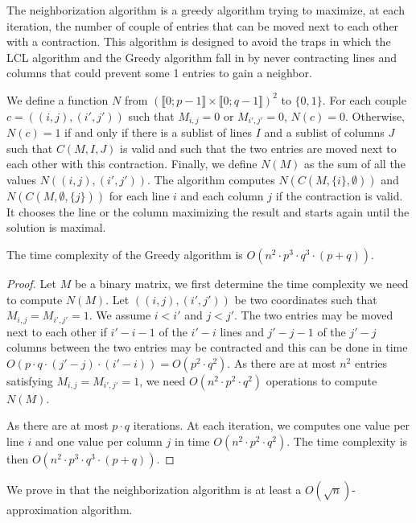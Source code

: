 The neighborization algorithm is a greedy algorithm trying to maximize, at each iteration, the number of couple of entries that can be moved next to each other with a contraction. This algorithm is designed to avoid the traps in which the LCL algorithm and the Greedy algorithm fall in by never contracting lines and columns that could prevent some 1 entries to gain a neighbor.

We define a function $N$ from $(\llbracket 0;p-1 \rrbracket \times \llbracket 0;q-1 \rrbracket)^2$ to $\{0,1\}$.
For each couple $c = ((i,j),(i',j'))$ such that $M_{i,j} = 0$ or $M_{i',j'} = 0$, $N(c) = 0$. Otherwise, $N(c) = 1$ if and only if there is a sublist of lines $I$ and a sublist of columns $J$ such that $C(M,I,J)$ is valid and such that the two entries are moved next to each other with this contraction. Finally, we define $N(M)$ as the sum of all the values $N((i,j),(i',j'))$. The algorithm computes $N(C(M,\{i\},\emptyset))$ and $N(C(M,\emptyset, \{j\}))$ for each line $i$ and each column $j$ if the contraction is valid. It chooses the line or the column maximizing the result and starts again until the solution is maximal.

\begin{theorem}
	The time complexity of the Greedy algorithm is $O(n^2 \cdot p^3 \cdot q^3 \cdot (p+q))$. 
\end{theorem}
\begin{proof}
	Let $M$ be a binary matrix, we first determine the time complexity we need to compute $N(M)$. Let $((i,j),(i',j'))$ be two coordinates such that $M_{i,j} = M_{i',j'} = 1$. We assume $i < i'$ and $j < j'$. The two entries may be moved next to each other if $i'- i -1$ of the $i'-i$ lines and $j'- j -1$ of the $j'-j$ columns between the two entries may be contracted and this can be done in time $O(p \cdot q \cdot (j'-j) \cdot (i'-i)) = O(p^2 \cdot q^2)$. As there are at most $n^2$ entries satisfying $M_{i,j} = M_{i',j'} = 1$, we need $O(n^2 \cdot p^2 \cdot q^2)$ operations to compute $N(M)$.  
	
	As there are at most $p \cdot q$ iterations. At each iteration, we computes one value per line $i$ and one value per column $j$ in time $O(n^2 \cdot p^2 \cdot q^2)$. The time complexity is then $O(n^2 \cdot p^3 \cdot q^3 \cdot (p+q))$.
\end{proof}

\begin{remark}
	We prove in \cite{WatelPoirionAppendix} that the neighborization algorithm is at least a $O(\sqrt{n})$-approximation algorithm.
\end{remark}

